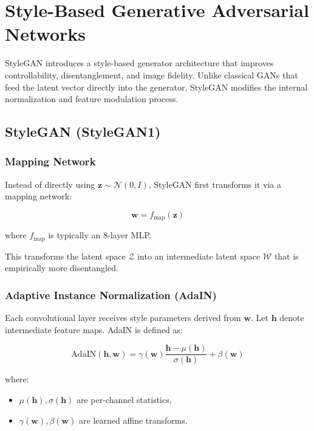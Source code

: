 \section{Style-Based Generative Adversarial Networks}
\label{sec:stylegan_theory}

StyleGAN introduces a style-based generator architecture that improves controllability, disentanglement, and image fidelity. Unlike classical GANs that feed the latent vector directly into the generator, StyleGAN modifies the internal normalization and feature modulation process.

\subsection{StyleGAN (StyleGAN1)}

\subsubsection{Mapping Network}

Instead of directly using $\mathbf{z} \sim \mathcal{N}(0,I)$, StyleGAN first transforms it via a mapping network:

\begin{equation}
\mathbf{w} = f_{\text{map}}(\mathbf{z})
\end{equation}

where $f_{\text{map}}$ is typically an 8-layer MLP.

This transforms the latent space $\mathcal{Z}$ into an intermediate latent space $\mathcal{W}$ that is empirically more disentangled.

\subsubsection{Adaptive Instance Normalization (AdaIN)}

Each convolutional layer receives style parameters derived from $\mathbf{w}$. Let $\mathbf{h}$ denote intermediate feature maps. AdaIN is defined as:

\begin{equation}
\text{AdaIN}(\mathbf{h}, \mathbf{w}) =
\gamma(\mathbf{w})
\frac{\mathbf{h} - \mu(\mathbf{h})}{\sigma(\mathbf{h})}
+ \beta(\mathbf{w})
\end{equation}

where:
\begin{itemize}
    \item $\mu(\mathbf{h}), \sigma(\mathbf{h})$ are per-channel statistics,
    \item $\gamma(\mathbf{w}), \beta(\mathbf{w})$ are learned affine transforms.
\end{itemize}

